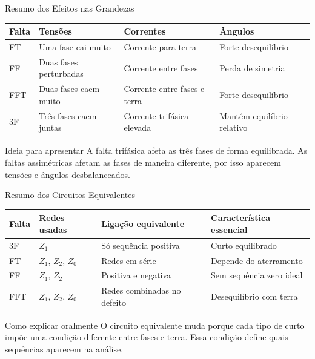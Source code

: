 \documentclass[aspectratio=169,11pt]{beamer}
\begin{document}
\begin{frame}{Resumo dos Efeitos nas Grandezas}
  \begin{table}
    \centering
    \scriptsize
    \begin{tabular}{llll}
      \toprule
      Falta & Tensões & Correntes & Ângulos \\
      \midrule
      FT & Uma fase cai muito & Corrente para terra & Forte desequilíbrio \\
      FF & Duas fases perturbadas & Corrente entre fases & Perda de simetria \\
      FFT & Duas fases caem muito & Corrente entre fases e terra & Forte desequilíbrio \\
      3F & Três fases caem juntas & Corrente trifásica elevada & Mantém equilíbrio relativo \\
      \bottomrule
    \end{tabular}
  \end{table}

  \begin{block}{Ideia para apresentar}
    A falta trifásica afeta as três fases de forma equilibrada. As faltas assimétricas afetam as fases de maneira diferente, por isso aparecem tensões e ângulos desbalanceados.
  \end{block}
\end{frame}

\begin{frame}{Resumo dos Circuitos Equivalentes}
  \begin{table}
    \centering
    \scriptsize
    \begin{tabular}{llll}
      \toprule
      Falta & Redes usadas & Ligação equivalente & Característica essencial \\
      \midrule
      3F & $Z_1$ & Só sequência positiva & Curto equilibrado \\
      FT & $Z_1$, $Z_2$, $Z_0$ & Redes em série & Depende do aterramento \\
      FF & $Z_1$, $Z_2$ & Positiva e negativa & Sem sequência zero ideal \\
      FFT & $Z_1$, $Z_2$, $Z_0$ & Redes combinadas no defeito & Desequilíbrio com terra \\
      \bottomrule
    \end{tabular}
  \end{table}

  \begin{block}{Como explicar oralmente}
    O circuito equivalente muda porque cada tipo de curto impõe uma condição diferente entre fases e terra. Essa condição define quais sequências aparecem na análise.
  \end{block}
\end{frame}
\end{document}
